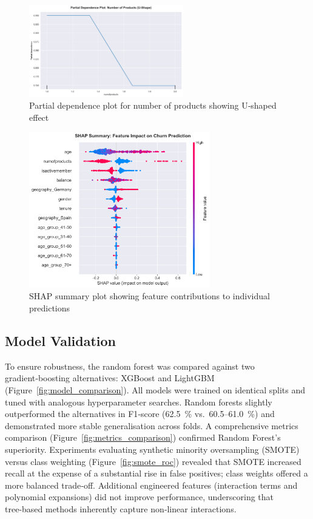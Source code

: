 \documentclass[12pt]{article}
\begin{document}
\begin{figure}[H]
\centering
\includegraphics[width=0.6\textwidth]{img/19_pdp_numofproducts.png}
\caption{Partial dependence plot for number of products showing U‑shaped effect}
\label{fig:pdp_products}
\end{figure}

\begin{figure}[H]
\centering
\includegraphics[width=0.7\textwidth]{img/20_shap_summary.png}
\caption{SHAP summary plot showing feature contributions to individual predictions}
\label{fig:shap}
\end{figure}

\subsection{Model Validation}
To ensure robustness, the random forest was compared against two gradient‑boosting alternatives: XGBoost and LightGBM (Figure~\ref{fig:model_comparison}).  All models were trained on identical splits and tuned with analogous hyperparameter searches.  Random forests slightly outperformed the alternatives in F1‑score (62.5~\% vs.\ 60.5–61.0~\%) and demonstrated more stable generalisation across folds.  A comprehensive metrics comparison (Figure~\ref{fig:metrics_comparison}) confirmed Random Forest's superiority.  Experiments evaluating synthetic minority oversampling (SMOTE) versus class weighting (Figure~\ref{fig:smote_roc}) revealed that SMOTE increased recall at the expense of a substantial rise in false positives; class weights offered a more balanced trade‑off.  Additional engineered features (interaction terms and polynomial expansions) did not improve performance, underscoring that tree‑based methods inherently capture non‑linear interactions.
\end{document}
